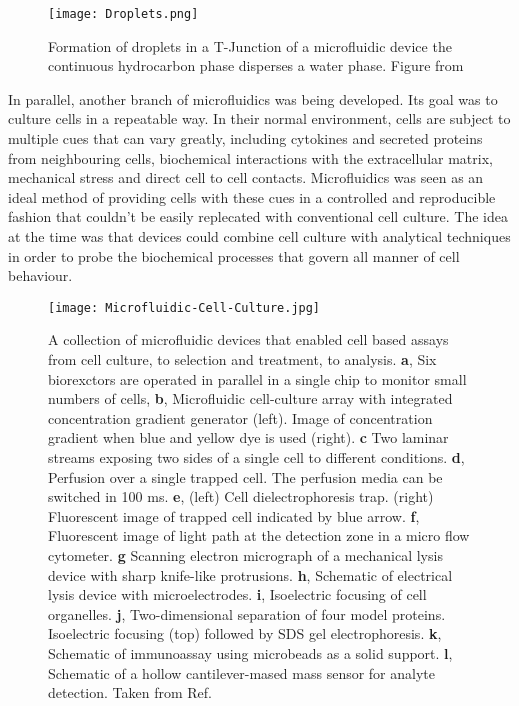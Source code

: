 \begin{figure}
  \texttt{[image: Droplets.png]}
  \caption{Formation of droplets in a T-Junction of a microfluidic device the continuous hydrocarbon
  phase disperses a water phase. Figure from \citep{RN104}}
  \label{fig:IntroDrops}
\end{figure}



In parallel, another branch of microfluidics was being developed. Its goal was to
culture cells in a repeatable way. In their normal environment, cells are subject to multiple
cues that can vary greatly, including cytokines and secreted proteins from neighbouring cells, biochemical
interactions with the extracellular matrix, mechanical stress and direct cell to cell contacts.
Microfluidics was seen as an ideal method of providing cells with these cues in a controlled and reproducible fashion that couldn't be easily
replecated with conventional cell culture. The idea at the time was that devices could combine
cell culture with analytical techniques in order to probe the biochemical processes that
govern all manner of cell behaviour.

\begin{figure}
  \begin{center}
  \texttt{[image: Microfluidic-Cell-Culture.jpg]}
  \end{center}
  \caption{A collection of microfluidic devices that enabled cell based assays from cell culture, to selection and treatment,
  to analysis. \textbf{a}, Six biorexctors are operated in parallel in a single chip to monitor small numbers of cells\citep{balagadde2005long},
  \textbf{b}, Microfluidic cell-culture array with integrated concentration gradient generator (left). Image of concentration
  gradient when blue and yellow dye is used (right)\citep{RN41}. \textbf{c} Two laminar streams exposing two sides of a single cell to different
  conditions\citep{takayama2001laminar}.
  \textbf{d}, Perfusion over a single trapped cell. The perfusion media can be switched in 100 ms\citep{wheeler2003microfluidic}. \textbf{e}, (left) Cell dielectrophoresis
  trap. (right) Fluorescent image of trapped cell indicated by blue arrow\citep{Voldman:2002gf}. \textbf{f}, Fluorescent image of light path at the detection
  zone in a micro flow cytometer\citep{wang2004measurements}. \textbf{g} Scanning electron micrograph of a mechanical lysis device with sharp knife-like protrusions\citep{di2003reagentless}.
  \textbf{h}, Schematic of electrical lysis device with microelectrodes\citep{lee1999micro}. \textbf{i}, Isoelectric focusing of cell organelles\citep{lu2004microfabricated}.
  \textbf{j}, Two-dimensional separation of four model proteins. Isoelectric focusing (top) followed by SDS gel electrophoresis\citep{li2004integration}.
  \textbf{k}, Schematic of immunoassay using microbeads as a solid support\citep{sato2002microchip}. \textbf{l}, Schematic of a hollow cantilever-mased mass sensor
  for analyte detection\citep{burg2003suspended}. Taken from Ref.\citep{el2006cells}}
  \label{fig:CellCulture}
\end{figure}


